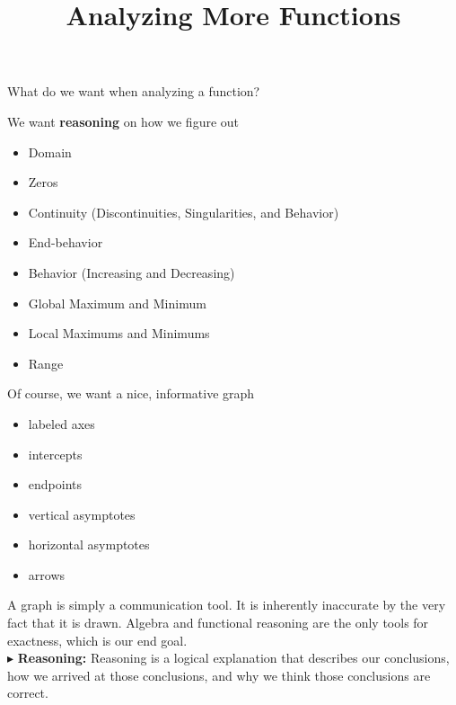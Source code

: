 \documentclass{ximera}
\title{Analyzing More Functions}
\begin{document}
\begin{abstract}
%
\end{abstract}
\maketitle











What do we want when analyzing a function?


We want \textbf{\textcolor{red!80!black}{reasoning}} on how we figure out

\begin{itemize}
\item Domain
\item Zeros 
\item Continuity (Discontinuities, Singularities, and Behavior)
\item End-behavior
\item Behavior (Increasing and Decreasing)
\item Global Maximum and Minimum
\item Local Maximums and Minimums
\item Range
\end{itemize}



Of course, we want a nice, informative graph
\begin{itemize}
	\item labeled axes
	\item intercepts
	\item endpoints
	\item vertical asymptotes
	\item horizontal asymptotes
	\item arrows
\end{itemize}


A graph is simply a communication tool.  It is inherently inaccurate by the very fact that it is drawn.  Algebra and functional reasoning are the only tools for exactness, which is our end goal. \\



$\blacktriangleright$ \textbf{\textcolor{red!70!black}{Reasoning:}} Reasoning is a logical explanation that describes our conclusions, how we arrived at those conclusions, and why we think those conclusions are correct. \\
\end{document}
